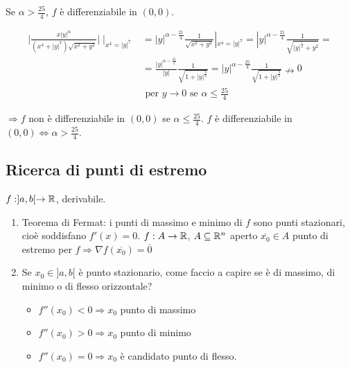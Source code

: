 \begin{exbar}
\begin{example}
\begin{enumerate}
		Se $\alpha > \frac{25}{4}$, $f$ è differenziabile in $(0,0)$.
		
		\begin{align*} 
			\bigg| \frac{x|y|^\alpha}{(x^4+|y|^7)\sqrt{x^2+y^2}} \bigg| \mid_{x^4=|y|^7}
			&=|y|^{\alpha -\frac{21}{4}}\frac{1}{\sqrt{x^2+y^2}}|_{x^4=|y|^7}=|y|^{\alpha-\frac{21}{4}}\frac{1}{\sqrt{|y|^{\frac{7}{2}}+y^2}}=
			\\
			&=\frac{|y|^{\alpha-\frac{21}{4}}}{|y|}\frac{1}{\sqrt{1+|y|^{\frac{3}{2}}}}=|y|^{\alpha-\frac{25}{4}}\frac{1}{\sqrt{1+|y|^{\frac{3}{2}}}}\nrightarrow 0
			\\
			&\text{ per } y \rightarrow 0 \text{ se } \alpha \leq \frac{25}{4}
		\end{align*}
		
		$\Rightarrow f$ non è differenziabile in $(0,0)$ se $\alpha \leq \frac{25}{4}$. $f$ è differenziabile in $(0,0)\Leftrightarrow \alpha > \frac{25}{4}$. 
	\end{enumerate}
\end{example}
\end{exbar}


\subsection{Ricerca di punti di estremo}

$f:]a,b[\rightarrow \mathbb{R}$, derivabile.
\begin{enumerate}
	\item Teorema di Fermat: i punti di massimo e minimo di $f$ sono punti stazionari, cioè soddisfano $f'(x)=0$.
	$f: A \rightarrow \mathbb{R}$, $A \subseteq \mathbb{R}^n$ aperto $\overline{x_0}\in A$ punto di estremo per $f \Rightarrow \nabla f(\overline{x_0})=\overline{0}$
	
	\item Se $x_0 \in ]a,b[$ è punto stazionario, come faccio a capire se è di massimo, di minimo o di flesso orizzontale?
	\begin{itemize} 
		\item $f''(x_0)<0 \Rightarrow x_0$ punto di massimo
		\item $f''(x_0)>0 \Rightarrow x_0$ punto di minimo
		\item $f''(x_0)=0 \Rightarrow x_0$ è candidato punto di flesso.
	\end{itemize}
\end{enumerate}


